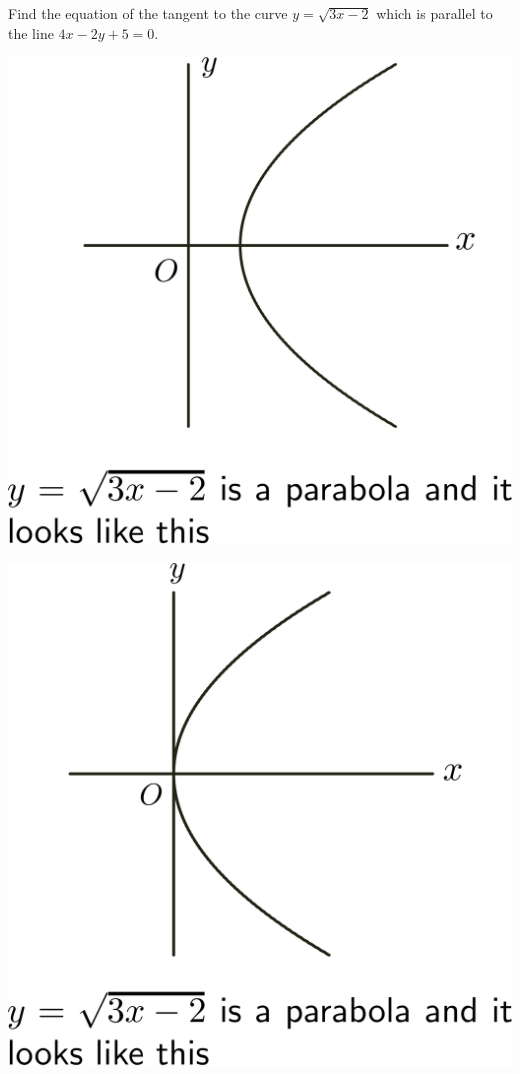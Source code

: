 \documentclass[14pt,fleqn]{extarticle}
\begin{document}
Find the equation of the tangent to the 
curve $y = \sqrt{3x - 2}$ which is parallel to the 
line $4x-2y +5 =0$.
%

\newcard 

\begin{center}
\includegraphics[scale=0.4]{r-1.svg} 
\end{center} 

\newcard 

\begin{center}
\includegraphics[scale=0.4]{w-1.svg}
\end{center} 
\end{document}

